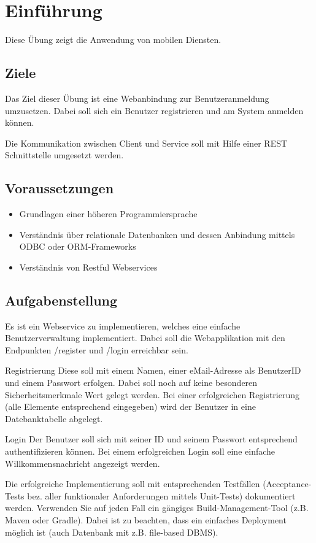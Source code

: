 
\section{Einführung}
Diese Übung zeigt die Anwendung von mobilen Diensten.

\subsection{Ziele}
Das Ziel dieser Übung ist eine Webanbindung zur Benutzeranmeldung umzusetzen. Dabei soll sich ein Benutzer registrieren und am System anmelden können.

Die Kommunikation zwischen Client und Service soll mit Hilfe einer REST Schnittstelle umgesetzt werden.

\subsection{Voraussetzungen}
\begin{itemize}
	\item Grundlagen einer höheren Programmiersprache
	\item Verständnis über relationale Datenbanken und dessen Anbindung mittels ODBC oder ORM-Frameworks
	\item Verständnis von Restful Webservices
\end{itemize}


\subsection{Aufgabenstellung}
Es ist ein Webservice zu implementieren, welches eine einfache Benutzerverwaltung implementiert. Dabei soll die Webapplikation mit den Endpunkten /register und /login erreichbar sein.

Registrierung
Diese soll mit einem Namen, einer eMail-Adresse als BenutzerID und einem Passwort erfolgen. Dabei soll noch auf keine besonderen Sicherheitsmerkmale Wert gelegt werden. Bei einer erfolgreichen Registrierung (alle Elemente entsprechend eingegeben) wird der Benutzer in eine Datebanktabelle abgelegt.

Login
Der Benutzer soll sich mit seiner ID und seinem Passwort entsprechend authentifizieren können. Bei einem erfolgreichen Login soll eine einfache Willkommensnachricht angezeigt werden.

Die erfolgreiche Implementierung soll mit entsprechenden Testfällen (Acceptance-Tests bez. aller funktionaler Anforderungen mittels Unit-Tests) dokumentiert werden. Verwenden Sie auf jeden Fall ein gängiges Build-Management-Tool (z.B. Maven oder Gradle). Dabei ist zu beachten, dass ein einfaches Deployment möglich ist (auch Datenbank mit z.B. file-based DBMS).
\clearpage
